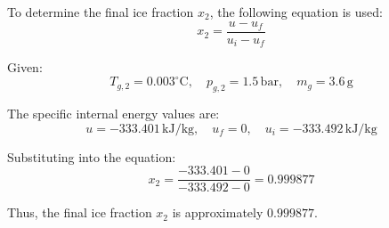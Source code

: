 To determine the final ice fraction \( x_2 \), the following equation is used:  
\[
x_2 = \frac{u - u_f}{u_i - u_f}
\]  

Given:  
\[
T_{g,2} = 0.003^\circ\text{C}, \quad p_{g,2} = 1.5 \, \text{bar}, \quad m_g = 3.6 \, \text{g}
\]  

The specific internal energy values are:  
\[
u = -333.401 \, \text{kJ/kg}, \quad u_f = 0, \quad u_i = -333.492 \, \text{kJ/kg}
\]  

Substituting into the equation:  
\[
x_2 = \frac{-333.401 - 0}{-333.492 - 0} = 0.999877
\]  

Thus, the final ice fraction \( x_2 \) is approximately \( 0.999877 \).